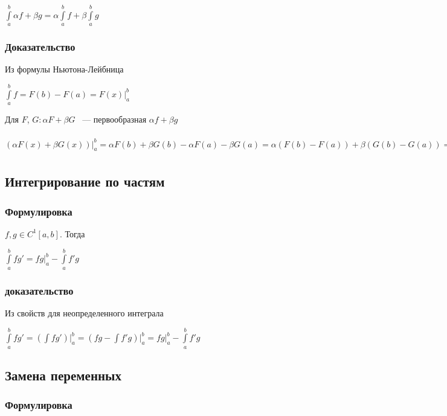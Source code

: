 \documentclass{article}
\begin{document}
                $\int\limits^b_a \alpha f + \beta g = \alpha \int\limits^b_a f + \beta \int\limits^b_a g$
			
			\subsubsection{Доказательство} 
			
                Из формулы Ньютона-Лейбница
			
                $\int\limits^b_a f = F(b) - F(a) = F(x) \bigg|^b_a$
			
                Для $F$, $G : \alpha F + \beta G$ ~--- первообразная $\alpha f + \beta g$
			
                $\left(\alpha F(x) + \beta G(x)\right) \bigg|^b_a = \alpha F(b) + \beta G(b) - \alpha F(a) - \beta G(a) = \alpha (F(b) - F(a)) + \beta (G(b) - G(a)) = \alpha \int\limits^b_a f + \beta \int\limits^b_a g$
			
		\subsection{Интегрирование по частям}
		
			\subsubsection{Формулировка}
			
                $f, g \in C^{1}[a, b]$. Тогда
			
                $\int\limits^b_a f g' = fg \bigg|^b_a - \int\limits^b_a f'g$
			
			\subsubsection{доказательство}
			
                Из свойств для неопределенного интеграла
			
                $\int\limits^b_a f g' = \left(\int f g'\right) \bigg|^b_a = \left(fg - \int f' g\right) \bigg|^b_a = fg \bigg|^b_a - \int\limits^b_a f'g$
		
		\subsection{Замена переменных}

			\subsubsection{Формулировка}
			
\end{document}
